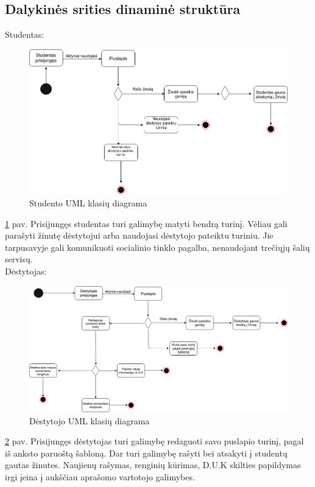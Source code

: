 \documentclass{VUMIFPSkursinis}
\begin{document}
\subsection{Dalykinės srities dinaminė struktūra}
Studentas:
\begin{figure}[H]
\centering
\includegraphics[width=\linewidth]{img/studentas.png}
\caption{Studento UML klasių diagrama}
\label{fig:studentu}
\end{figure}
\ref{fig:studentu} pav. Prisijungęs studentas turi galimybę matyti bendrą turinį. Vėliau gali parašyti žinutę dėstytojui arba naudojasi dėstytojo pateiktu turiniu. Jie tarpusavyje gali komunikuoti socialinio tinklo pagalba, nenaudojant trečiųjų šalių servisų.\\
Dėstytojas: \\
\begin{figure}[H]
\centering
\includegraphics[width=\linewidth]{img/destytojas.png}
\caption{Dėstytojo UML klasių diagrama}
\label{fig:destytoju}
\end{figure}
\ref{fig:destytoju} pav. Prisijungęs dėstytojas turi galimybę redaguoti savo puslapio turinį, pagal iš anksto paruoštą šabloną. Dar turi galimybę rašyti bei atsakyti į studentų gautas žinutes. Naujienų rašymas, renginių kūrimas, D.U.K skilties papildymas irgi įeina į aukščiau aprašomo vartotojo galimybes.\\
\end{document}
